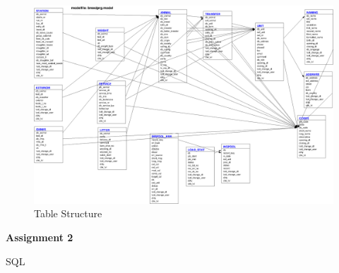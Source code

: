 \documentclass[10pt,a4paper,DIV14]{scrartcl}
\begin{document}
\begin{figure}[htb]
   \centering  \includegraphics[scale=0.9, angle=90]{breedprg.model.eps}
   \caption{Table Structure}
\label{stru}
\end{figure}



\newpage

\centerline{\Large \bf Assignment 2}
\vspace{5mm}
\centerline{\Large  SQL}
\vspace{12mm}
\end{document}
